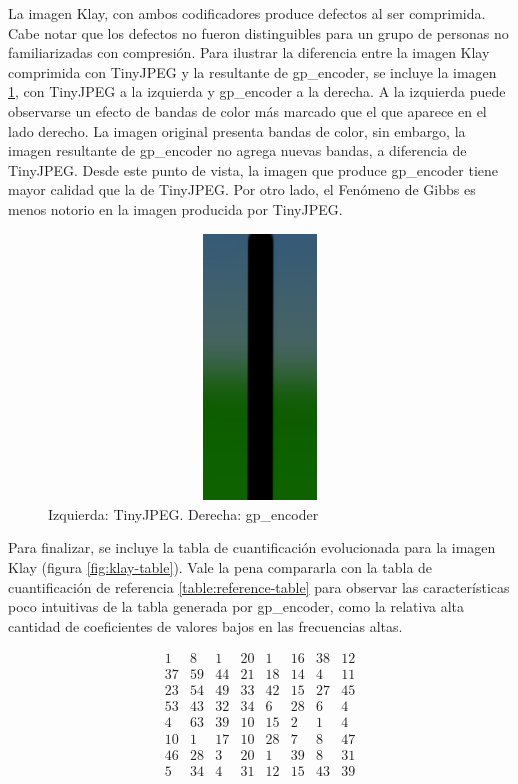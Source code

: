 La imagen Klay, con ambos codificadores produce defectos al ser comprimida.
Cabe notar que los defectos no fueron distinguibles para un grupo de personas
no familiarizadas con compresión. Para ilustrar la diferencia entre la
imagen Klay comprimida con TinyJPEG y la resultante de gp\_encoder, se incluye
la imagen \ref{img:banding}, con TinyJPEG a la izquierda y gp\_encoder a la
derecha. A la izquierda puede observarse un efecto de bandas de color más
marcado que el que aparece en el lado derecho. La imagen original presenta bandas de
color, sin embargo, la imagen resultante de gp\_encoder no agrega nuevas
bandas, a diferencia de TinyJPEG. Desde este punto de vista, la imagen que
produce gp\_encoder tiene mayor calidad que la de TinyJPEG. Por otro lado, el
Fenómeno de Gibbs es menos notorio en la imagen producida por TinyJPEG.

\begin{figure}
    \includegraphics[width=400pt, height=200pt]{banding}
    \caption{Izquierda: TinyJPEG. Derecha: gp\_encoder}
    \label{img:banding}
\end{figure}

Para finalizar, se incluye la tabla de cuantificación evolucionada para la
imagen Klay (figura \ref{fig:klay-table}). Vale la pena compararla con la tabla de
cuantificación de referencia \ref{table:reference-table} para observar las
características poco intuitivas de la tabla generada por gp\_encoder, como la
relativa alta cantidad de coeficientes de valores bajos en las frecuencias
altas.


\begin{equation}
    \begin{matrix}
        1  &   8  &  1  & 20  &  1  & 16  & 38  & 12 \\
        37 &   59 &  44 &  21 &  18 &  14 &   4 &  11 \\
        23 &   54 &  49 &  33 &  42 &  15 &  27 &  45 \\
        53 &   43 &  32 &  34 &   6 &  28 &   6 &   4 \\
        4  &  63  & 39  & 10  & 15  &  2  &  1  &  4 \\
        10 &    1 &  17 &  10 &  28 &   7 &   8 &  47 \\
        46 &   28 &   3 &  20 &   1 &  39 &   8 &  31 \\
        5  &  34  &  4  & 31  & 12  & 15  & 43  & 39
    \end{matrix}
    \label{fig:klay-table}
\end{equation}

